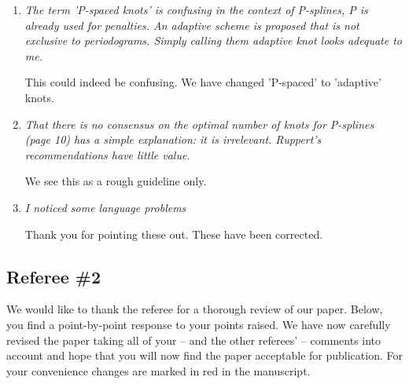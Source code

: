 \documentclass{scrartcl}
\newcommand{\refereeQuote}{\textit }
\newcommand{\response}{}
\begin{document}
\begin{enumerate}
\item
\refereeQuote{
The term 'P-spaced knots' is confusing in the context of P-splines, P is already used for penalties. An adaptive scheme is proposed that is not exclusive to periodograms. Simply calling them adaptive knot looks adequate to me.}\smallskip

\response{ This could indeed be confusing. We have changed 'P-spaced' to 'adaptive' knots.}\bigskip

\item
\refereeQuote{That there is no consensus on the optimal number of knots for P-splines (page 10) has a simple explanation: it is irrelevant. Ruppert's recommendations have little value.}\smallskip

\response{We see this as a rough guideline only.}\bigskip


\item
\refereeQuote{I noticed some language problems}\smallskip

\response{Thank you for pointing these out. These have been corrected.}


\end{enumerate}

\newpage

\subsection*{Referee \#2}


\response{We would like to thank the referee for a thorough review of our paper. Below, you find a point-by-point response to your points raised. We have now carefully revised the paper taking all of your -- and the other referees' -- comments into account and hope that you will now find the paper acceptable for publication. For your convenience changes are marked in red in the manuscript.
} \smallskip
\end{document}
